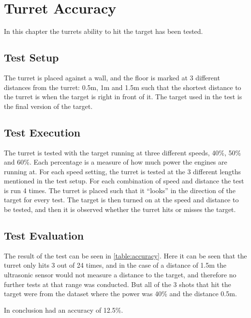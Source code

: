 \chapter{Turret Accuracy}\label{TurretAcc}
In this chapter the turrets ability to hit the target has been tested.

\section{Test Setup}
The turret is placed against a wall, and the floor is marked at 3 different
distances from the turret: 0.5m, 1m and 1.5m such that the shortest distance to
the turret is when the target is right in front of it. The target used
in the test is the final version of the target.

\section{Test Execution}
The turret is tested with the target running at three different speeds,
40\%, 50\% and 60\%. Each percentage is a measure of how much power the engines
are running at. For each speed setting, the turret is tested at the 3 different
lengths mentioned in the test setup. For each combination of speed and distance the test
is run 4 times. The turret is placed such that it ``looks'' in the direction of
the target for every test. The target is then turned on at the speed and distance to be tested,
and then it is observed whether the turret hits or misses the target.

\section{Test Evaluation}
The result of the test can be seen in \autoref{table:accuracy}. Here it can be
seen that the turret only hits 3 out of 24 times, and in the
case of a distance of 1.5m the ultrasonic sensor would not measure a distance to
the target, and therefore no further tests at that range was conducted. But all
of the 3 shots that hit the target were from the dataset where the power was
40\% and the distance 0.5m. 


In conclusion \name had an accuracy of 12.5\%.
